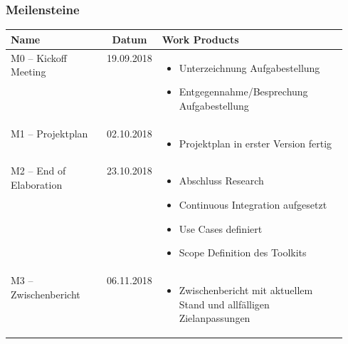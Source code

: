 \subsubsection{Meilensteine}
\begin{table}[H]
    \centering
    \def\arraystretch{2}
    \begin{tabular}{|l|c|p{0.55\linewidth}|} \hline
        \textbf{Name} & \textbf{Datum} & \textbf{Work Products} \\ \hline
        M0 – Kickoff Meeting & 19.09.2018 &
        \vspace{-7mm}
        \begin{itemize}
            \setlength\itemsep{0mm}
            \item Unterzeichnung Aufgabestellung
            \item Entgegennahme/Besprechung Aufgabestellung
            \vspace{-\topsep}
        \end{itemize} \\ \hline
        M1 – Projektplan & 02.10.2018 &
        \vspace{-7mm}
        \begin{itemize}
            \setlength\itemsep{0mm}
            \item Projektplan in erster Version fertig
            \vspace{-\topsep}
        \end{itemize} \\ \hline
        M2 – End of Elaboration & 23.10.2018 &
        \vspace{-7mm}
        \begin{itemize}
            \setlength\itemsep{0mm}
            \item Abschluss Research
            \item Continuous Integration aufgesetzt
            \item Use Cases definiert
            \item Scope Definition des Toolkits
            \vspace{-\topsep}
        \end{itemize} \\ \hline
        M3 – Zwischenbericht & 06.11.2018 &
        \vspace{-7mm}
        \begin{itemize}
            \setlength\itemsep{0mm}
            \item Zwischenbericht mit aktuellem Stand und allfälligen Zielanpassungen

\end{itemize}
\end{tabular}
\end{table}
